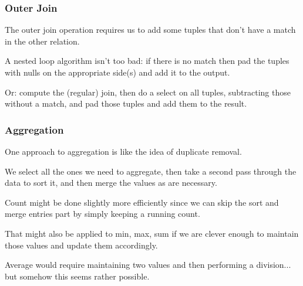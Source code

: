 \begin{frame}
\frametitle{Outer Join}

The outer join operation requires us to add some tuples that don't have a match in the other relation. 

A nested loop algorithm isn't too bad: if there is no match then pad the tuples with nulls on the appropriate side(s) and add it to the output.

Or: compute the (regular) join, then do a select on all tuples, subtracting those without a match, and pad those tuples and add them to the result.


\end{frame}

\begin{frame}
\frametitle{Aggregation}

One approach to aggregation is like the idea of duplicate removal. 

We select all the ones we need to aggregate, then take a second pass through the data to sort it, and then merge the values as are necessary.

Count might be done slightly more efficiently since we can skip the sort and merge entries part by simply keeping a running count. 

That might also be applied to min, max, sum if we are clever enough to maintain those values and update them accordingly. 

Average would require maintaining two values and then performing a division... but somehow this seems rather possible.



\end{frame}
















